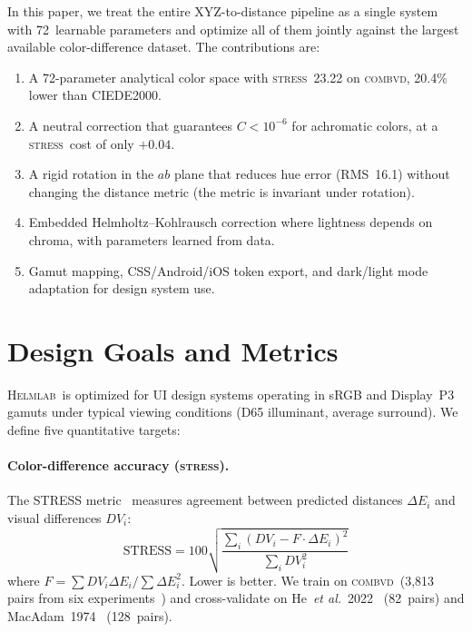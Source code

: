 \documentclass[11pt, twocolumn]{article}
\newcommand{\helmlab}{\textsc{Helmlab}}
\newcommand{\stress}{\textsc{stress}}
\newcommand{\combvd}{\textsc{combvd}}
\newcommand{\etal}{\textit{et al.}}
\begin{document}
In this paper, we treat the entire XYZ-to-distance pipeline as a
single system with 72~learnable parameters and optimize all of them
jointly against the largest available color-difference dataset.
The contributions are:

\begin{enumerate}
  \item A 72-parameter analytical color space with \stress\ 23.22
    on \combvd, 20.4\% lower than CIEDE2000.
  \item A neutral correction that guarantees $C < 10^{-6}$ for
    achromatic colors, at a \stress\ cost of only $+0.04$.
  \item A rigid rotation in the $ab$ plane that reduces hue error
    (RMS~16.1\textdegree) without changing the distance metric
    (the metric is invariant under rotation).
  \item Embedded Helmholtz--Kohlrausch correction where lightness
    depends on chroma, with parameters learned from data.
  \item Gamut mapping, CSS/Android/iOS token export, and dark/light
    mode adaptation for design system use.
\end{enumerate}


\section{Design Goals and Metrics}
\label{sec:goals}

\helmlab\ is optimized for UI design systems operating in sRGB and
Display~P3 gamuts under typical viewing conditions (D65 illuminant,
average surround). We define five quantitative targets:

\paragraph{Color-difference accuracy (\stress).}
The STRESS metric~\cite{luo2006} measures agreement between predicted
distances $\Delta E_i$ and visual differences $DV_i$:
\begin{equation}
  \mathrm{STRESS} = 100\sqrt{\frac{\sum_i(DV_i - F \cdot \Delta E_i)^2}{\sum_i DV_i^2}}
  \label{eq:stress}
\end{equation}
where $F = \sum DV_i \Delta E_i / \sum \Delta E_i^2$. Lower is better.
We train on \combvd\ (3{,}813 pairs from six experiments~\cite{luo2006})
and cross-validate on He~\etal\ 2022~\cite{he2022} (82~pairs) and
MacAdam~1974~\cite{macadam1974} (128~pairs).
\end{document}
